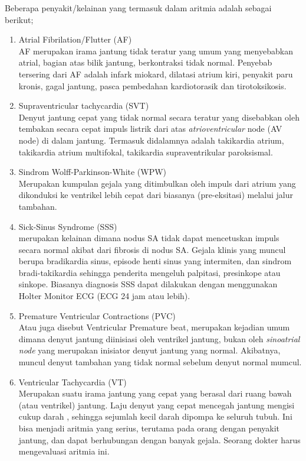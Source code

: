 Beberapa penyakit/kelainan yang termasuk dalam aritmia adalah sebagai
berikut;
\begin{enumerate}
  \item Atrial Fibrilation/Flutter (AF) \\
  AF merupakan irama jantung tidak teratur yang umum yang menyebabkan atrial,
  bagian atas bilik jantung, berkontraksi tidak normal. Penyebab tersering dari
  AF adalah infark miokard, dilatasi atrium kiri, penyakit paru kronis, gagal
  jantung, pasca pembedahan kardiotorasik dan tirotoksikosis.
  
  \item Supraventricular tachycardia (SVT) \\
  Denyut jantung cepat yang	tidak  normal secara teratur yang disebabkan oleh
  tembakan secara cepat impuls listrik  dari atas \textit{atrioventricular} node
  (AV node) di dalam jantung. Termasuk didalamnya adalah takikardia atrium,
  takikardia atrium multifokal, takikardia supraventrikular paroksismal.

  \item Sindrom Wolff-Parkinson-White (WPW) \\
  Merupakan kumpulan gejala yang ditimbulkan oleh impuls dari atrium yang
  dikonduksi ke ventrikel lebih cepat dari biasanya (pre-eksitasi) melalui jalur
  tambahan.

  \item Sick-Sinus Syndrome (SSS) \\
  merupakan kelainan dimana nodus SA tidak dapat mencetuskan impuls secara
  normal akibat dari fibrosis di nodus SA. Gejala klinis yang muncul berupa
  bradikardia sinus, episode henti sinus yang intermiten, dan sindrom
  bradi-takikardia sehingga penderita mengeluh palpitasi, presinkope atau
  sinkope. Biasanya diagnosis SSS dapat dilakukan dengan menggunakan Holter
  Monitor ECG (ECG 24 jam atau lebih).
  
  \item Premature Ventricular Contractions (PVC) \\
  Atau juga disebut Ventricular Premature beat, merupakan kejadian umum  dimana
  denyut jantung diinisiasi oleh ventrikel jantung,   bukan  oleh
  \textit{sinoatrial node} yang merupakan  inisiator denyut jantung yang normal.
  Akibatnya, muncul denyut tambahan yang tidak normal sebelum denyut normal
  mumcul.

  \item Ventricular Tachycardia (VT) \\
  Merupakan suatu irama jantung yang cepat yang berasal dari ruang bawah (atau
  ventrikel) jantung. Laju denyut yang cepat mencegah jantung mengisi cukup
  darah , sehingga sejumlah kecil darah dipompa ke seluruh tubuh. Ini bisa
  menjadi aritmia yang serius,  terutama pada orang dengan penyakit
  jantung, dan dapat berhubungan dengan banyak  gejala. Seorang dokter harus
  mengevaluasi aritmia ini.
		

\end{enumerate}
